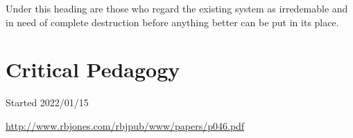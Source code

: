 \documentclass[10pt,titlepage]{article}
\begin{document}
Under this heading are those who regard the existing system as irredemable and in need of complete destruction before anything better can be put in its place.

\cite{pluckrose-cynical,lindsay-racemarx,friere-poled,gottesman-criturn}

\appendix

\section{Critical Pedagogy}


\cite{friere-poled,gottesman-criturn}


{}





\tiny{
Started 2022/01/15


\href{http://www.rbjones.com/rbjpub/www/papers/p046.pdf}{http://www.rbjones.com/rbjpub/www/papers/p046.pdf}

}%
\end{document}
